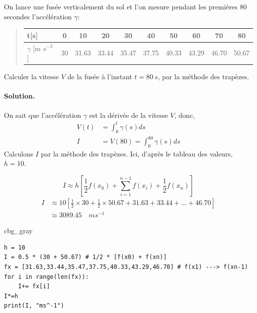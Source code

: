 \documentclass[%
oneside,                 %
final,                   %
10pt,french]{article}
\newenvironment{_cod_tight}[1]{
   \def\FrameCommand{\colorbox{#1}}
   \FrameRule0.6pt\MakeFramed {\FrameRestore}\vskip3mm}
   {\vskip0mm\endMakeFramed}
\newenvironment{cod}[1]{
\bgroup\rmfamily
\fboxsep=0mm\relax
\begin{_cod_tight}{#1}
\list{}{\parsep=-2mm\parskip=0mm\topsep=0pt\leftmargin=2mm
\rightmargin=2\leftmargin\leftmargin=4pt\relax}
\item\relax}
{\endlist\end{_cod_tight}\egroup}
\newenvironment{doconceexercise}{}{}
\newcounter{doconceexercisecounter}
\begin{document}
\begin{doconceexercise}



On lance une fusée verticalement du sol et l’on mesure pendant les premières 80 secondes l'accélération $\gamma$:


\begin{quote}
\begin{tabular}{lccccccccc}
\hline
\multicolumn{1}{l}{ t[s] } & \multicolumn{1}{c}{ 0 } & \multicolumn{1}{c}{ 10 } & \multicolumn{1}{c}{ 20 } & \multicolumn{1}{c}{ 30 } & \multicolumn{1}{c}{ 40 } & \multicolumn{1}{c}{ 50 } & \multicolumn{1}{c}{ 60 } & \multicolumn{1}{c}{ 70 } & \multicolumn{1}{c}{ 80 } \\
\hline
$\gamma$ [m $s^{-2}$] & 30 & 31.63 & 33.44 & 35.47 & 37.75 & 40.33 & 43.29 & 46.70 & 50.67 \\
\hline
\end{tabular}
\end{quote}

\noindent
Calculer la vitesse $V$ de la fusée à l’instant $t=80 \ s$, par la méthode des trapèzes.


\paragraph{Solution.}
On sait que l’accélération $\gamma$ est la dérivée de la vitesse $V$, donc,
\begin{align*}
V(t) &= \int_0^t \gamma(s) ds \\
I &= V(80) = \int_0^{80} \gamma(s) ds
\end{align*}
Calculons $I$ par la méthode des trapèzes. Ici, d’après le tableau des valeurs, $h = 10$.

\begin{equation*}
I \approx h \left[\frac{1}{2}f(x_0) + \sum_{i=1}^{n-1}f(x_i) + \frac{1}{2}f(x_n) \right]
\end{equation*}
\begin{align*}
I &\approx 10 \left[\frac{1}{2} \times 30 + \frac{1}{2} \times 50.67 + 31.63 + 33.44 + \ldots + 46.70 \right] \\
  &\approx 3089.45 \quad ms^{-1}
\end{align*}
\begin{cod}{cbg_gray}\begin{verbatim}
h = 10
I = 0.5 * (30 + 50.67) # 1/2 * [f(x0) + f(xn)]
fx = [31.63,33.44,35.47,37.75,40.33,43.29,46.70] # f(x1) ---> f(xn-1)
for i in range(len(fx)):
    I+= fx[i]
I*=h
print(I, "ms^-1")

\end{verbatim}
\end{cod}
\noindent


\end{doconceexercise}
\end{document}
